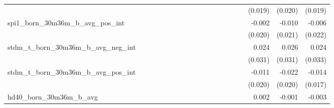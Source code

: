 \begin{tabular}{lrrrrrrrrrrrrrrrrrr}
                                            &              &              &              &              &              &              &              &              &               &              &              &               &              &              &               &      (0.019) &      (0.020) &       (0.019) \\ 
spi1\_born\_30m36m\_b\_avg\_pos\_int        &              &              &              &              &              &              &              &              &               &              &              &               &              &              &               &       -0.002 &       -0.010 &        -0.006 \\ 
                                            &              &              &              &              &              &              &              &              &               &              &              &               &              &              &               &      (0.020) &      (0.021) &       (0.022) \\ 
stdm\_t\_born\_30m36m\_b\_avg\_neg\_int     &              &              &              &              &              &              &              &              &               &              &              &               &              &              &               &        0.024 &        0.026 &         0.024 \\ 
                                            &              &              &              &              &              &              &              &              &               &              &              &               &              &              &               &      (0.031) &      (0.031) &       (0.033) \\ 
stdm\_t\_born\_30m36m\_b\_avg\_pos\_int     &              &              &              &              &              &              &              &              &               &              &              &               &              &              &               &       -0.011 &       -0.022 &        -0.014 \\ 
                                            &              &              &              &              &              &              &              &              &               &              &              &               &              &              &               &      (0.020) &      (0.020) &       (0.017) \\ 
hd40\_born\_30m36m\_b\_avg                  &              &              &              &              &              &              &              &              &               &              &              &               &              &              &               &        0.002 &       -0.001 &        -0.003 \\ 

\end{tabular}
